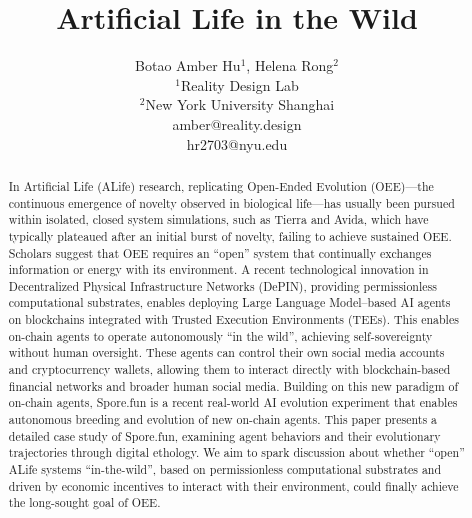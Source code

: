 \documentclass[letterpaper]{article}
\title{Artificial Life in the Wild}
\author{
    Botao Amber Hu$^{1}$, 
    Helena Rong$^{2}$
    \mbox{}\\
    $^1$Reality Design Lab\\
    $^2$New York University Shanghai \\
    amber@reality.design \\
    hr2703@nyu.edu
} %
\begin{document}
\maketitle


\begin{abstract}
In Artificial Life (ALife) research, replicating Open-Ended Evolution (OEE)---the continuous emergence of novelty observed in biological life---has usually been pursued within isolated, closed system simulations, such as Tierra and Avida, which have typically plateaued after an initial burst of novelty, failing to achieve sustained OEE. Scholars suggest that OEE requires an ``open'' system that continually exchanges information or energy with its environment. A recent technological innovation in Decentralized Physical Infrastructure Networks (DePIN), providing permissionless computational substrates, enables deploying Large Language Model--based AI agents on blockchains integrated with Trusted Execution Environments (TEEs). This enables on-chain agents to operate autonomously ``in the wild'', achieving self-sovereignty without human oversight. These agents can control their own social media accounts and cryptocurrency wallets, allowing them to interact directly with blockchain-based financial networks and broader human social media. Building on this new paradigm of on-chain agents, Spore.fun is a recent real-world AI evolution experiment that enables autonomous breeding and evolution of new on-chain agents. This paper presents a detailed case study of Spore.fun, examining agent behaviors and their evolutionary trajectories through digital ethology. We aim to spark discussion about whether ``open'' ALife systems ``in-the-wild'', based on permissionless computational substrates and driven by economic incentives to interact with their environment, could finally achieve the long-sought goal of OEE.
\end{abstract}













\end{document}
